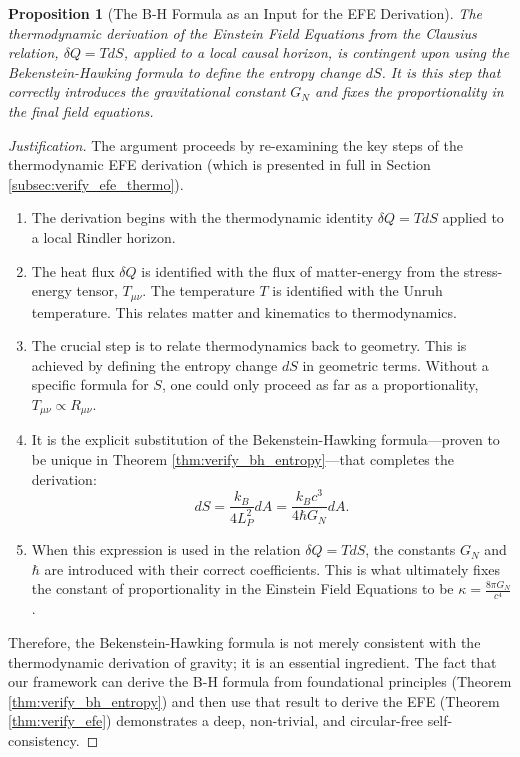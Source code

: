 \documentclass[11pt, letterpaper]{report}
\theoremstyle{plain} %
\newtheorem{proposition}[theorem]{Proposition}
\theoremstyle{definition} %
\theoremstyle{remark} %
\begin{document}
\begin{proposition}[The B-H Formula as an Input for the EFE Derivation]
\label{prop:bh_efe_link}
The thermodynamic derivation of the Einstein Field Equations from the Clausius relation, $\delta Q = TdS$, applied to a local causal horizon, is contingent upon using the Bekenstein-Hawking formula to define the entropy change $dS$. It is this step that correctly introduces the gravitational constant $G_N$ and fixes the proportionality in the final field equations.
\end{proposition}
\begin{proof}[Justification]
The argument proceeds by re-examining the key steps of the thermodynamic EFE derivation (which is presented in full in Section \ref{subsec:verify_efe_thermo}).
\begin{enumerate}
    \item The derivation begins with the thermodynamic identity $\delta Q = T dS$ applied to a local Rindler horizon.
    \item The heat flux $\delta Q$ is identified with the flux of matter-energy from the stress-energy tensor, $T_{\mu\nu}$. The temperature $T$ is identified with the Unruh temperature. This relates matter and kinematics to thermodynamics.
    \item The crucial step is to relate thermodynamics back to geometry. This is achieved by defining the entropy change $dS$ in geometric terms. Without a specific formula for $S$, one could only proceed as far as a proportionality, $T_{\mu\nu} \propto R_{\mu\nu}$.
    \item It is the explicit substitution of the Bekenstein-Hawking formula—proven to be unique in Theorem \ref{thm:verify_bh_entropy}—that completes the derivation:
    \begin{equation}
        dS = \frac{k_B}{4 L_P^2} dA = \frac{k_B c^3}{4\hbar G_N} dA.
        \label{eq:ds_da_link}
    \end{equation}
    \item When this expression is used in the relation $\delta Q = TdS$, the constants $G_N$ and $\hbar$ are introduced with their correct coefficients. This is what ultimately fixes the constant of proportionality in the Einstein Field Equations to be $\kappa = \frac{8\pi G_N}{c^4}$.
\end{enumerate}
Therefore, the Bekenstein-Hawking formula is not merely consistent with the thermodynamic derivation of gravity; it is an essential ingredient. The fact that our framework can derive the B-H formula from foundational principles (Theorem \ref{thm:verify_bh_entropy}) and then use that result to derive the EFE (Theorem \ref{thm:verify_efe}) demonstrates a deep, non-trivial, and circular-free self-consistency.
\end{proof}
\end{document}
